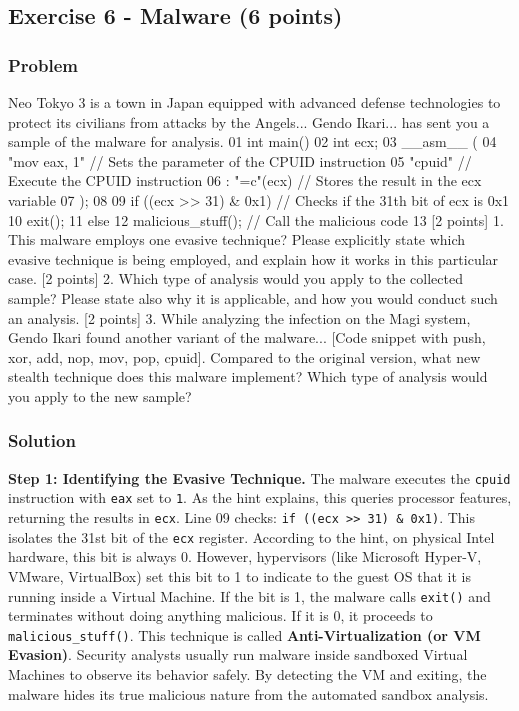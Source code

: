\documentclass{article}
\begin{document}
\subsection{Exercise 6 - Malware (6 points)}
\subsubsection*{Problem}
Neo Tokyo 3 is a town in Japan equipped with advanced defense technologies to protect its civilians from attacks by the Angels... Gendo Ikari... has sent you a sample of the malware for analysis.
01 int main() {
02 int ecx;
03 \_\_asm\_\_ (
04 "mov eax, 1" // Sets the parameter of the CPUID instruction
05 "cpuid" // Execute the CPUID instruction
06 : "=c"(ecx) // Stores the result in the ecx variable
07 );
08
09 if ((ecx >> 31) \& 0x1) // Checks if the 31th bit of ecx is 0x1
10 exit();
11 else
12 malicious\_stuff(); // Call the malicious code
13 }
[2 points] 1. This malware employs one evasive technique? Please explicitly state which evasive technique is being employed, and explain how it works in this particular case.
[2 points] 2. Which type of analysis would you apply to the collected sample? Please state also why it is applicable, and how you would conduct such an analysis.
[2 points] 3. While analyzing the infection on the Magi system, Gendo Ikari found another variant of the malware... [Code snippet with push, xor, add, nop, mov, pop, cpuid]. Compared to the original version, what new stealth technique does this malware implement? Which type of analysis would you apply to the new sample?

\subsubsection*{Solution}
\textbf{Step 1: Identifying the Evasive Technique.}
The malware executes the \texttt{cpuid} instruction with \texttt{eax} set to \texttt{1}. As the hint explains, this queries processor features, returning the results in \texttt{ecx}.
Line 09 checks: \texttt{if ((ecx >> 31) \& 0x1)}. This isolates the 31st bit of the \texttt{ecx} register.
According to the hint, on physical Intel hardware, this bit is always 0. However, hypervisors (like Microsoft Hyper-V, VMware, VirtualBox) set this bit to 1 to indicate to the guest OS that it is running inside a Virtual Machine.
If the bit is 1, the malware calls \texttt{exit()} and terminates without doing anything malicious. If it is 0, it proceeds to \texttt{malicious\_stuff()}.
This technique is called \textbf{Anti-Virtualization (or VM Evasion)}. Security analysts usually run malware inside sandboxed Virtual Machines to observe its behavior safely. By detecting the VM and exiting, the malware hides its true malicious nature from the automated sandbox analysis.
\end{document}
